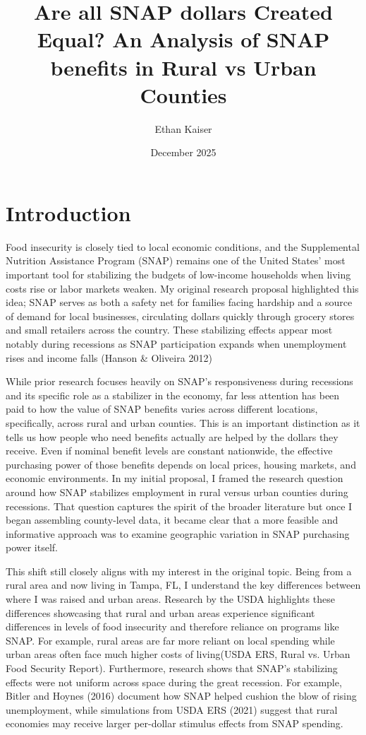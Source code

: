 \documentclass{article}
\title{Are all SNAP dollars Created Equal? An Analysis of SNAP benefits in Rural vs Urban Counties}
\author{Ethan Kaiser}
\date{December 2025}
\begin{document}
\maketitle
\newpage
\section{Introduction}

Food insecurity is closely tied to local economic conditions, and the Supplemental Nutrition Assistance Program (SNAP) remains one of the United States’ most important tool for stabilizing the budgets of low-income households when living costs rise or labor markets weaken. My original research proposal highlighted this idea; SNAP serves as both a safety net for families facing hardship and a source of demand for local businesses, circulating dollars quickly through grocery stores and small retailers across the country. These stabilizing effects appear most notably during recessions as SNAP participation expands when unemployment rises and income falls (Hanson & Oliveira 2012)

While prior research focuses heavily on SNAP's responsiveness during recessions and its specific role as a stabilizer in the economy, far less attention has been paid to how the value of SNAP benefits varies across different locations, specifically, across rural and urban counties. This is an important distinction as it tells us how people who need benefits actually are helped by the dollars they receive. Even if nominal benefit levels are constant nationwide, the effective purchasing power of those benefits depends on local prices, housing markets, and economic environments. In my initial proposal, I framed the research question around how SNAP stabilizes employment in rural versus urban counties during recessions. That question captures the spirit of the broader literature but once I began assembling county-level data, it became clear that a more feasible and informative approach was to examine geographic variation in SNAP purchasing power itself.

This shift still closely aligns with my interest in the original topic. Being from a rural area and now living in Tampa, FL, I understand the key differences between where I was raised and urban areas. Research by the USDA highlights these differences showcasing that rural and urban areas experience significant differences in levels of food insecurity and therefore reliance on programs like SNAP. For example, rural areas are far more reliant on local spending while urban areas often face much higher costs of living(USDA ERS, Rural vs. Urban Food Security Report). Furthermore, research shows that SNAP's stabilizing effects were not uniform across space during the great recession. For example, Bitler and Hoynes (2016) document how SNAP helped cushion the blow of rising unemployment, while simulations from USDA ERS (2021) suggest that rural economies may receive larger per-dollar stimulus effects from SNAP spending.
\end{document}
